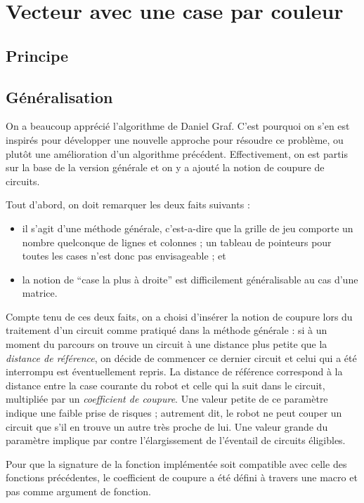 \documentclass[12pt,a4paper]{article}
\begin{document}
\section{Vecteur avec une case par couleur}
\subsection*{Principe}

\subsection*{G\'en\'eralisation}
On a beaucoup appr\'eci\'e l'algorithme de Daniel Graf. C'est pourquoi on s'en 
est inspir\'es pour d\'evelopper une nouvelle approche pour r\'esoudre ce 
probl\`eme, ou plut\^ot une am\'elioration d'un algorithme pr\'ec\'edent. 
Effectivement, on est partis sur la base de la version g\'en\'erale et on y a 
ajout\'e la notion de coupure de circuits.

Tout d'abord, on doit remarquer les deux faits suivants : 
\begin{itemize}
  \item il s'agit d'une m\'ethode g\'en\'erale, c'est-a-dire que la grille de 
jeu comporte un nombre quelconque de lignes et colonnes ; un tableau de 
pointeurs pour toutes les cases n'est donc pas envisageable ; et
\item la notion de \enquote{case la plus \`a droite} est difficilement 
g\'en\'eralisable au cas d'une matrice.
\end{itemize}

Compte tenu de ces deux faits, on a choisi d'ins\'erer la notion de coupure 
lors du traitement d'un circuit comme pratiqu\'e dans la m\'ethode g\'en\'erale 
: si \`a un moment du parcours on trouve un circuit \`a une distance plus 
petite que la {\itshape distance de r\'ef\'erence}, on d\'ecide de 
commencer ce dernier circuit et celui qui a \'et\'e interrompu est 
\'eventuellement repris. La distance de r\'ef\'erence correspond \`a la 
distance entre la case courante du robot et celle qui la suit dans le circuit, 
multipli\'ee par un {\itshape coefficient de coupure}. Une valeur petite de 
ce param\`etre indique une faible prise de risques ; autrement dit, le robot ne 
peut couper un circuit que s'il en trouve un autre tr\`es proche de lui. Une 
valeur grande du param\`etre implique par contre l'\'elargissement de 
l'\'eventail de circuits \'eligibles.

Pour que la signature de la fonction impl\'ement\'ee 
soit compatible avec celle des fonctions pr\'ec\'edentes, le coefficient de 
coupure a \'et\'e d\'efini \`a travers une macro et pas comme argument de 
fonction.
\end{document}
